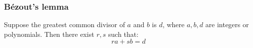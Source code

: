 \begin{frame}
\frametitle{B\'ezout's lemma}
\begin{lemma}
Suppose the greatest common divisor of $a$ and $b$ is $d$, where $a,b,d$ are integers or polynomials. Then there exist $r,s$ such that:
\[
ra+sb=d
\]
\end{lemma}
\end{frame}

